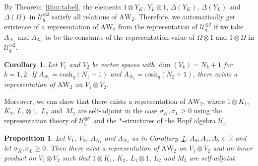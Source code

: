 \documentclass[10pt,a4paper]{amsart}
\numberwithin{equation}{section}
\newtheorem{Corollary}[Theorem]{Corollary}
\newtheorem{Proposition}[Theorem]{Proposition}
 { \theoremstyle{definition}
\newtheorem{Definition}[Theorem]{Definition}
\newtheorem{Note}[Theorem]{Note}
\newtheorem{Example}[Theorem]{Example}
\newtheorem{Remark}[Theorem]{Remark} }
\newcommand{\RR}{\mathbb{R}}
\newcommand{\AW}[1]{\mathrm{AW}_{#1}}
\newcommand{\chq}{\mathrm{cosh}_q}
\newcommand{\tensor}[1]{^{\otimes{#1}}}
\newcommand{\Uq}{\mathcal{U}_q}
\begin{document}
By Theorem~\ref{thm:tabel}, the elements $1\otimes Y_K$, $Y_L\otimes 1$, $\Delta(Y_K)$, $\Delta(Y_L)$ and $\Delta(\Omega)$ in $\Uq\tensor{2}$ satisfy all relations of $\AW{2}$. Therefore, we automatically get existence of a representation of $\AW{2}$ from the representation of $\Uq\tensor{2}$ if we take $A_{N_1}$ and $A_{N_2}$ to be the constants of the representation value of $\Omega\otimes1$ and $1\otimes \Omega$ in $\Uq\tensor{2}$.
\begin{Corollary}\label{cor:aw2reprexist}
	Let $V_1$ and $V_2$ be vector spaces with $\dim(V_k)=N_k+1$ for $k=1,2$. If $A_{N_1}=\chq(N_1+1)$ and $A_{N_2}=\chq(N_2+1)$, there exists a representation of $\AW{2}$ on $V_1\otimes V_2$.
\end{Corollary}
Moreover, we can show that there exists a representation of $\AW{2}$, where $1\otimes K_1$, $K_2$, $L_1\otimes 1$,~$L_2$ and~$M_2$ are self-adjoint in the case $\sigma_K,\sigma_L\geq0$ using the representation theory of $\Uq\tensor{2}$ and the $*$-structures of the Hopf algebra $\Uq$.
\begin{Proposition}\label{prop:*reprexists}
	Let $V_1$, $V_2$, $A_{N_1}$ and $A_{N_2}$ as in Corollary~{\rm \ref{cor:aw2reprexist}}, $A_0,A_1,A_2\in\RR$ and let ${\sigma_K,\sigma_L\geq 0}$. Then there exist a representation of $\AW{2}$ on $V_1\otimes V_2$ and an inner product on $V_1\otimes V_2$ such that $1\otimes K_1$, $K_2$, $L_1\otimes 1$, $L_2$ and $M_2$ are self-adjoint.			
\end{Proposition}
\end{document}
